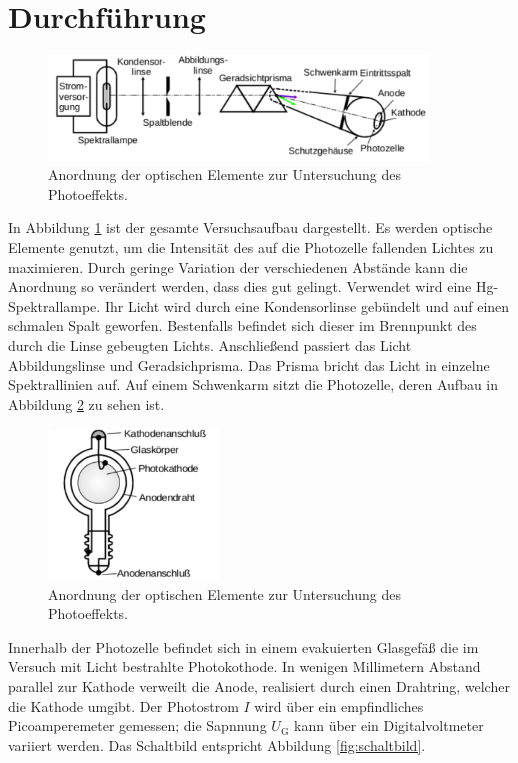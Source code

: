 \section{Durchf\"uhrung}
\label{sec:Durchfuehrung}

\begin{figure}
	\centering
	\includegraphics[width=0.9\textwidth]{Bilder/Aufbau.pdf}
	\caption{Anordnung der optischen Elemente zur Untersuchung des Photoeffekts. \cite{skript}}
	\label{fig:Aufbau}
\end{figure}
In Abbildung \ref{fig:Aufbau} ist der gesamte Versuchsaufbau dargestellt. 
Es werden optische Elemente genutzt, um die Intensität des auf die Photozelle fallenden Lichtes zu maximieren. 
Durch geringe Variation der verschiedenen Abstände kann die Anordnung so verändert werden, dass dies gut gelingt. 
Verwendet wird eine Hg-Spektrallampe.
Ihr Licht wird durch eine Kondensorlinse gebündelt und auf einen schmalen Spalt geworfen. 
Bestenfalls befindet sich dieser im Brennpunkt des durch die Linse gebeugten Lichts.
Anschließend passiert das Licht Abbildungslinse und Geradsichprisma. 
Das Prisma bricht das Licht in einzelne Spektrallinien auf. 
Auf einem Schwenkarm sitzt die Photozelle, deren Aufbau in Abbildung \ref{fig:Photozelle} zu sehen ist. 

\begin{figure}[H]
	\centering
	\includegraphics[width=0.4\textwidth]{Bilder/Schema_Photozelle.pdf}
	\caption{Anordnung der optischen Elemente zur Untersuchung des Photoeffekts. \cite{skript}}
	\label{fig:Photozelle}
\end{figure}
Innerhalb der Photozelle befindet sich in einem evakuierten Glasgefäß die im Versuch mit Licht bestrahlte Photokothode. 
In wenigen Millimetern Abstand parallel zur Kathode verweilt die Anode, realisiert durch einen Drahtring, welcher die Kathode umgibt. 
Der Photostrom $I$ wird über ein empfindliches Picoamperemeter gemessen; die Sapnnung $U_\mathup{G}$ kann über ein Digitalvoltmeter variiert werden. 
Das Schaltbild entspricht Abbildung \ref{fig:schaltbild}. 

